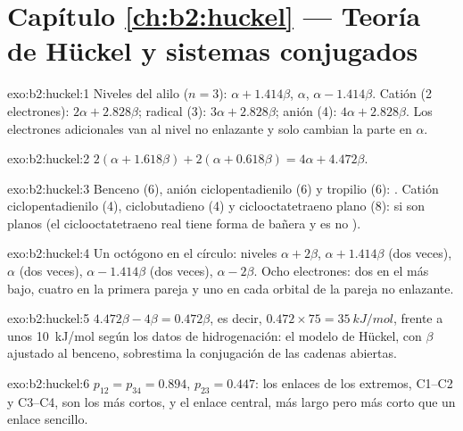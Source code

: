 \section*{Capítulo \ref{ch:b2:huckel} --- Teoría de Hückel y sistemas conjugados}

\begin{solution}{exo:b2:huckel:1}
Niveles del alilo ($n = 3$): $\alpha + 1.414\beta$, $\alpha$, $\alpha - 1.414\beta$. Catión (2 electrones):
$2\alpha + 2.828\beta$; radical (3): $3\alpha + 2.828\beta$; anión (4): $4\alpha + 2.828\beta$. Los electrones
adicionales van al nivel no enlazante y solo cambian la parte en $\alpha$.
\end{solution}

\begin{solution}{exo:b2:huckel:2}
$2(\alpha + 1.618\beta) + 2(\alpha + 0.618\beta) = 4\alpha + 4.472\beta$.
\end{solution}

\begin{solution}{exo:b2:huckel:3}
Benceno (6), anión ciclopentadienilo (6) y tropilio (6): . Catión
ciclopentadienilo (4), ciclobutadieno (4) y ciclooctatetraeno plano (8):  si son planos
(el ciclooctatetraeno real tiene forma de bañera y es no ).
\end{solution}

\begin{solution}{exo:b2:huckel:4}
Un octógono en el círculo: niveles $\alpha + 2\beta$, $\alpha + 1.414\beta$ (dos veces), $\alpha$ (dos veces),
$\alpha - 1.414\beta$ (dos veces), $\alpha - 2\beta$. Ocho electrones: dos en el más bajo, cuatro en la
primera pareja y uno en cada orbital de la pareja no enlazante.
\end{solution}

\begin{solution}{exo:b2:huckel:5}
$4.472\beta - 4\beta = 0.472\beta$, es decir, $0.472 \times 75 = \qty{35}{kJ/mol}$, frente a unos
\qty{10}{kJ/mol} según los datos de hidrogenación: el modelo de Hückel, con $\beta$ ajustado al benceno,
sobrestima la conjugación de las cadenas abiertas.
\end{solution}

\begin{solution}{exo:b2:huckel:6}
$p_{12} = p_{34} = 0.894$, $p_{23} = 0.447$: los enlaces de los extremos, C1--C2 y C3--C4, son los
más cortos, y el enlace central, más largo pero más corto que un enlace sencillo.
\end{solution}

